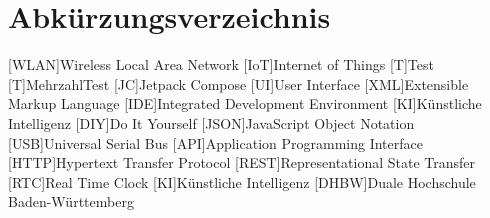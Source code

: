 \chapter*{Abkürzungsverzeichnis}
\begin{acronym}[SBC]                
	[WLAN]{Wireless Local Area Network}
	[IoT]{Internet of Things}
	{Test}
	{MehrzahlTest}
	[JC]{Jetpack Compose}
	[UI]{User Interface}
	[XML]{Extensible Markup Language}
	[IDE]{Integrated Development Environment}
	[KI]{Künstliche Intelligenz}
	[DIY]{Do It Yourself}
	[JSON]{JavaScript Object Notation}
	[USB]{Universal Serial Bus}
	[API]{Application Programming Interface}
	[HTTP]{Hypertext Transfer Protocol}
	[REST]{Representational State Transfer}
	[RTC]{Real Time Clock}
	[KI]{Künstliche Intelligenz}
	[DHBW]{Duale Hochschule Baden-Württemberg}
\end{acronym}
